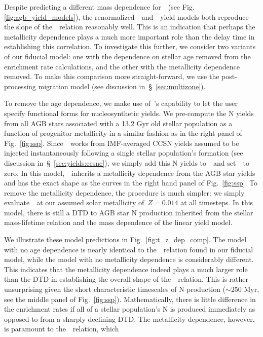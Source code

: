 \documentclass[ms.tex]{subfiles}
\begin{document}
Despite predicting a different mass dependence for~~(see Fig.
\ref{fig:agb_yield_models}), the renormalized~\cristallo~and~\ventura~yield
models both reproduce the slope of the~\ohno~relation reasonably well.
This is an indication that perhaps the metallicity dependence plays a much
more important role than the delay time in establishing this correlation.
To investigate this further, we consider two variants of our fiducial model:
one with the dependence on stellar age removed from the enrichment rate
calculations, and the other with the metallicity dependence removed.
To make this comparison more straight-forward, we use the post-processing
migration model (see discussion in~\S~\ref{sec:multizone}).
\par
To remove the age dependence, we make use of~\vice's capability to let the user
specify functional forms for nucleosynthetic yields.
We pre-compute the N yields from all AGB stars associated with a 13.2 Gyr old
stellar population as a function of progenitor metallicity in a similar fashion
as in the right panel of Fig.~\ref{fig:ssp}.
Since~\vice~works from IMF-averaged CCSN yields assumed to be injected
instantaneously following a single stellar population's formation (see
discussion in~\S~\ref{sec:yields:ccsne}), we simply add this N yields
to~~and set~~to zero.
In this model,~~inherits a metallicity dependence from the AGB star
yields and has the exact shape as the curves in the right hand panel of
Fig.~\ref{fig:ssp}.
To remove the metallicity dependence, the procedure is much simpler: we simply
evaluate~~at our assumed solar metallicity of~$Z = 0.014$ at all
timesteps.
In this model, there is still a DTD to AGB star N production inherited from the
stellar mass-lifetime relation and the mass dependence of the linear yield
model.
\par
We illustrate these model predictions in Fig.~\ref{fig:t_z_dep_comp}.
The model with no age dependence is nearly identical to the~\ohno~relation
found in our fiducial model, while the model with no metallicity dependence
is considerably different.
This indicates that the metallicity dependence indeed plays a much larger role
than the DTD in establishing the overall shape of the~\ohno~relation.
This is rather unsurprising given the short characteristic timescales of N
production ($\sim$250 Myr, see the middle panel of Fig.~\ref{fig:ssp}).
Mathematically, there is little difference in the enrichment rates if all of a
stellar population's N is produced immediately as opposed to from a sharply
declining DTD.
The metallicity dependence, however, is paramount to the~\ohno~relation, which
\end{document}
